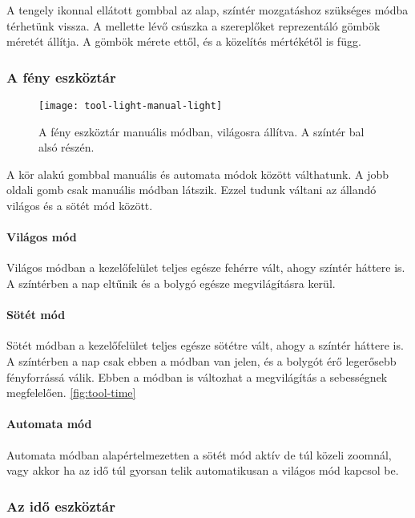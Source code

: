A tengely ikonnal ellátott gombbal az alap, színtér mozgatáshoz szükséges módba térhetünk vissza. A mellette lévő csúszka a szereplőket reprezentáló gömbök méretét állítja. A gömbök mérete ettől, és a közelítés mértékétől is függ.

\subsubsection{A fény eszköztár}

\begin{figure}[h!]
	\centering
	\texttt{[image: tool-light-manual-light]}
	\caption{A fény eszköztár manuális módban, világosra állítva. A színtér bal alsó részén.}
	\label{fig:tool-light-manual-light}
\end{figure}

A kör alakú gombbal manuális és automata módok között válthatunk. A jobb oldali gomb csak manuális módban látszik. Ezzel tudunk váltani az állandó világos és a sötét mód között.

\paragraph{Világos mód}

Világos módban a kezelőfelület teljes egésze fehérre vált, ahogy színtér háttere is. A színtérben a nap eltűnik és a bolygó egésze megvilágításra kerül.

\paragraph{Sötét mód}

Sötét módban a kezelőfelület teljes egésze sötétre vált, ahogy a színtér háttere is. A színtérben a nap csak ebben a módban van jelen, és a bolygót érő legerősebb fényforrássá válik. Ebben a módban is változhat a megvilágítás a sebességnek megfelelően. \ref{fig:tool-time}

\paragraph{Automata mód}

Automata módban alapértelmezetten a sötét mód aktív de túl közeli zoomnál, vagy akkor ha az idő túl gyorsan telik automatikusan a világos mód kapcsol be.

\subsubsection{Az idő eszköztár}

